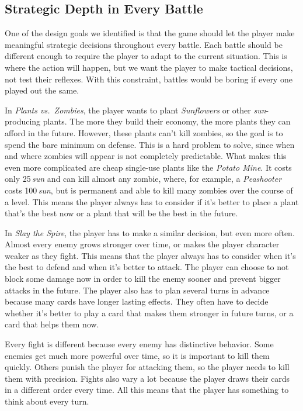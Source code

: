 \subsection{Strategic Depth in Every Battle} \label{sec:goal-depth-battle}

One of the design goals we identified is that the game should let the player make meaningful strategic decisions throughout every battle.
Each battle should be different enough to require the player to adapt to the current situation.
This is where the action will happen, but we want the player to make tactical decisions, not test their reflexes.
With this constraint, battles would be boring if every one played out the same.

In \emph{Plants vs.\ Zombies}, the player wants to plant \emph{Sunflowers} or other \emph{sun}-producing plants.
The more they build their economy, the more plants they can afford in the future.
However, these plants can't kill zombies, so the goal is to spend the bare minimum on defense.
This is a hard problem to solve, since when and where zombies will appear is not completely predictable.
What makes this even more complicated are cheap single-use plants like the \emph{Potato Mine}.
It costs only 25\,\emph{sun} and can kill almost any zombie, where, for example, a \emph{Peashooter} costs 100\,\emph{sun}, but is permanent and able to kill many zombies over the course of a level.
This means the player always has to consider if it's better to place a plant that's the best now or a plant that will be the best in the future.

In \emph{Slay the Spire}, the player has to make a similar decision, but even more often.
Almost every enemy grows stronger over time, or makes the player character weaker as they fight.
This means that the player always has to consider when it's the best to defend and when it's better to attack.
The player can choose to not block some damage now in order to kill the enemy sooner and prevent bigger attacks in the future.
The player also has to plan several turns in advance because many cards have longer lasting effects.
They often have to decide whether it's better to play a card that makes them stronger in future turns, or a card that helps them now.

Every fight is different because every enemy has distinctive behavior.
Some enemies get much more powerful over time, so it is important to kill them quickly.
Others punish the player for attacking them, so the player needs to kill them with precision.
Fights also vary a lot because the player draws their cards in a different order every time.
All this means that the player has something to think about every turn.

